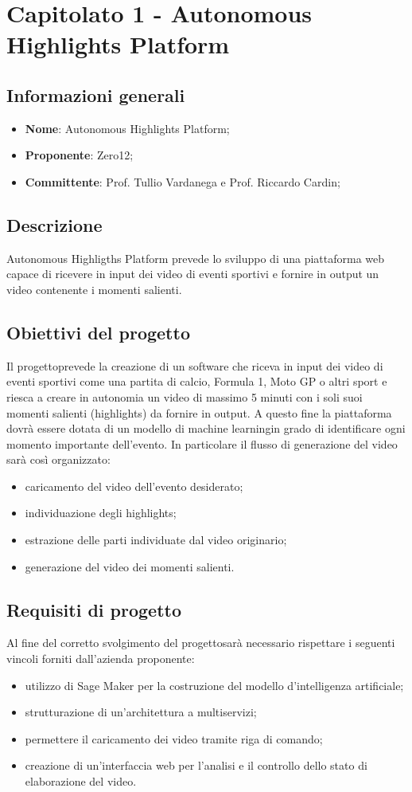 \section{Capitolato 1 - Autonomous Highlights Platform}
\subsection{Informazioni generali}
\begin{itemize}
	\item \textbf{Nome}: Autonomous Highlights Platform;
	\item \textbf{Proponente}: Zero12;
	\item \textbf{Committente}: Prof. Tullio Vardanega e Prof. Riccardo Cardin;
\end{itemize}
\subsection{Descrizione}
Autonomous Highligths Platform prevede lo sviluppo di una piattaforma web capace di ricevere in input dei video di eventi sportivi e fornire in output un video contenente i momenti salienti.
\subsection{Obiettivi del progetto}
Il progetto\glosp prevede la creazione di un software che riceva in input dei video di eventi sportivi come una partita di calcio, Formula 1, Moto GP o altri sport e riesca a creare in autonomia un video di massimo 5 minuti con i soli suoi momenti salienti (highlights) da fornire in output. A questo fine la piattaforma dovrà essere dotata di un modello di machine learning\glosp in grado di identificare ogni momento importante dell’evento.
In particolare il flusso di generazione del video sarà così organizzato:
\begin{itemize}
	\item caricamento del video dell'evento desiderato;
	\item individuazione degli highlights;
	\item estrazione delle parti individuate dal video originario;
	\item generazione del video dei momenti salienti.
\end{itemize}
\subsection{Requisiti di progetto}
Al fine del corretto svolgimento del progetto\glosp sarà necessario rispettare i seguenti vincoli forniti dall'azienda proponente:
\begin{itemize}
	\item utilizzo di Sage Maker per la costruzione del modello d'intelligenza artificiale\glo;
	\item strutturazione di un'architettura a multiservizi\glo;
	\item permettere il caricamento dei video tramite riga di comando;
	\item creazione di un'interfaccia web per l'analisi e il controllo dello stato di elaborazione del video.
\end{itemize}
